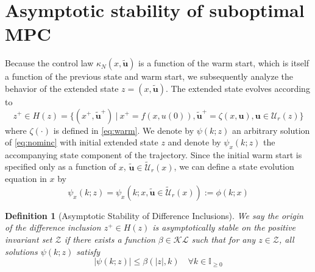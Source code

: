 \documentclass{article}
\newtheorem{definition}{Definition}
\newcommand{\abs}[1]{\left\lvert #1 \right\rvert}
\begin{document}
\section{Asymptotic stability of suboptimal MPC}
Because the control law $\kappa_N(x,\tilde{\mathbf{u}})$ is a function of the warm start, which is
itself a function of the previous state and warm start, we subsequently analyze the behavior of the
extended state $z = (x,\tilde{\mathbf{u}})$. 
The extended state evolves according to
\begin{equation}
\label{eq:nominc}
z^+ \in H(z) = \{(x^+,\tilde{\mathbf{u}}^+) \ | \ x^+ = f(x,u(0)), \tilde{\mathbf{u}}^+ = \zeta(x,\mathbf{u}), 
\mathbf{u} \in \mathcal{U}_r(z)\}
\end{equation}
where $\zeta(\cdot)$ is defined in \eqref{eq:warm}. 
We denote by $\psi(k;z)$ an arbitrary solution of 
\eqref{eq:nominc} with initial extended state $z$ and denote by $\psi_x(k;z)$ the accompanying state 
component of the trajectory. Since the initial warm start is specified only as a function of $x$, 
$\tilde{\mathbf{u}} \in \tilde{\mathcal{U}}_r(x)$,
we can define a state evolution equation in $x$ by
\begin{equation}
\label{eq:nomincx}
\psi_x(k;z) = \psi_x(k;x,\tilde{\mathbf{u}} \in \tilde{\mathcal{U}}_r(x)) := \phi(k;x)
\end{equation}
\begin{definition}[Asymptotic Stability of Difference Inclusions]
\label{def:as}
We say the origin of the difference inclusion $z^+ \in H(z)$ is 
asymptotically stable on the positive invariant set $\mathcal{Z}$ if there exists a function
$\beta \in \mathcal{KL}$ such that for any $z \in \mathcal{Z}$, all solutions
$\psi(k;z)$ satisfy
\begin{equation*}
\abs{\psi(k;z)} \leq \beta(\abs{z},k) \quad \forall k \in \mathbb{I}_{\geq 0}
\end{equation*}
\end{definition}
\end{document}

